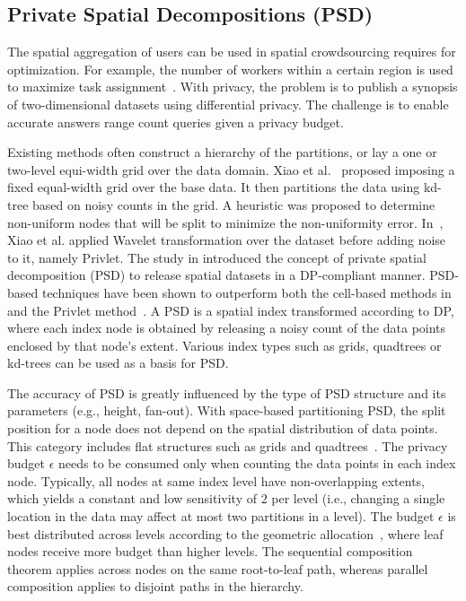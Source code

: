 \documentclass{USC-Thesis}
\numberwithin{equation}{chapter}
\begin{document}
\subsection{Private Spatial Decompositions (PSD)}
\label{sec:PSD-prelim}
The spatial aggregation of users can be used in spatial crowdsourcing requires for optimization. For example, the number of workers within a certain region is used to maximize task assignment~\cite{to2014framework,to2015server}. With privacy, the problem is to publish a synopsis of two-dimensional datasets using differential privacy. The challenge is to enable accurate answers range count queries given a privacy budget.

Existing methods often construct a hierarchy of the partitions, or lay a one or two-level equi-width grid over the data domain. Xiao et al.~\cite{xiao2010differentially} proposed imposing a fixed equal-width grid over the base data. It then partitions the data using kd-tree based on noisy counts in the grid. A heuristic was proposed to determine non-uniform nodes that will be split to minimize the non-uniformity error. In~\cite{xiao2011differential}, Xiao et al. applied Wavelet transformation over the dataset before adding noise to it, namely Privlet.
The study in \cite{cormode2012differentially} introduced the concept of private spatial decomposition (PSD) to release spatial datasets in a DP-compliant manner. PSD-based techniques have been shown to outperform both the cell-based methods in~\cite{xiao2010differentially} and the Privlet method~\cite{xiao2011differential}. A PSD is a spatial index transformed according to DP, where each index node is obtained by releasing a noisy count of the data points enclosed by that node's extent. Various index types such as grids, quadtrees or kd-trees \cite{samet2006foundations} can be used as a basis for PSD. 

The accuracy of PSD is greatly influenced by the type of PSD structure and its parameters (e.g., height, fan-out). With space-based partitioning PSD, the split position for a node does not depend on the spatial distribution of data points. This category includes flat structures such as grids and quadtrees~\cite{samet2006foundations}. The privacy budget $\epsilon$ needs to be consumed only when counting the data points in each index node. Typically, all nodes at same index level have non-overlapping extents, which yields a constant and low sensitivity of $2$ per level (i.e., changing a single location in the data may affect at most two partitions in a level). The budget $\epsilon$ is best distributed across levels according to the geometric allocation~\cite{cormode2012differentially}, where leaf nodes receive more budget than higher levels. The sequential composition theorem applies across nodes on the same root-to-leaf path, whereas parallel composition applies to disjoint paths in the hierarchy.
\end{document}
